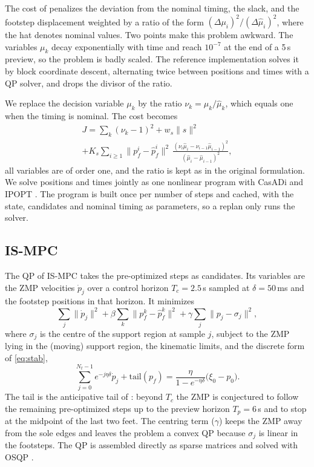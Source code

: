 \documentclass[conference]{IEEEtran}
\begin{document}
The cost of \cite{dallard2025adios} penalizes the deviation from the nominal timing, the slack, and the footstep displacement weighted by a ratio of the form $(\Delta\mu_i)^2/(\Delta\hat\mu_i)^2$, where the hat denotes nominal values.
Two points make this problem awkward.
The variables $\mu_k$ decay exponentially with time and reach $10^{-7}$ at the end of a 5\,s preview, so the problem is badly scaled.
The reference implementation \cite{ismpcwalking} solves it by block coordinate descent, alternating twice between positions and times with a QP solver, and drops the divisor of the ratio.

We replace the decision variable $\mu_k$ by the ratio $\nu_k=\mu_k/\hat\mu_k$, which equals one when the timing is nominal.
The cost becomes
\begin{multline}
J=\sum_k(\nu_k-1)^2+w_s\|s\|^2\\
+K_s\sum_{i\ge1}\big\|p_f^i-\hat p_f^i\big\|^2\,
\frac{(\nu_i\hat\mu_i-\nu_{i-1}\hat\mu_{i-1})^2}{(\hat\mu_i-\hat\mu_{i-1})^2},
\label{eq:cost}
\end{multline}
all variables are of order one, and the ratio is kept as in the original formulation.
We solve positions and times jointly as one nonlinear program with CasADi \cite{andersson2019casadi} and IPOPT \cite{wachter2006ipopt}.
The program is built once per number of steps and cached, with the state, candidates and nominal timing as parameters, so a replan only runs the solver.

\subsection{IS-MPC}
The QP of IS-MPC takes the pre-optimized steps as candidates.
Its variables are the ZMP velocities $\dot p_j$ over a control horizon $T_c=2.5$\,s sampled at $\delta=50$\,ms and the footstep positions in that horizon.
It minimizes
\begin{equation}
\sum_j\|\dot p_j\|^2+\beta\sum_k\|p_f^k-\hat p_f^k\|^2+\gamma\sum_j\|p_j-\sigma_j\|^2 ,
\end{equation}
where $\sigma_j$ is the centre of the support region at sample $j$, subject to the ZMP lying in the (moving) support region, the kinematic limits, and the discrete form of \eqref{eq:stab},
\begin{equation}
\sum_{j=0}^{N_t-1}e^{-j\eta\delta}\dot p_j+\mathrm{tail}(p_f)=\frac{\eta}{1-e^{-\eta\delta}}\big(\xi_0-p_0\big).
\label{eq:stabqp}
\end{equation}
The tail is the anticipative tail of \cite{scianca2020ismpc}: beyond $T_c$ the ZMP is conjectured to follow the remaining pre-optimized steps up to the preview horizon $T_p=6$\,s and to stop at the midpoint of the last two feet.
The centring term ($\gamma$) keeps the ZMP away from the sole edges and leaves the problem a convex QP because $\sigma_j$ is linear in the footsteps.
The QP is assembled directly as sparse matrices and solved with OSQP \cite{stellato2020osqp}.
\end{document}
